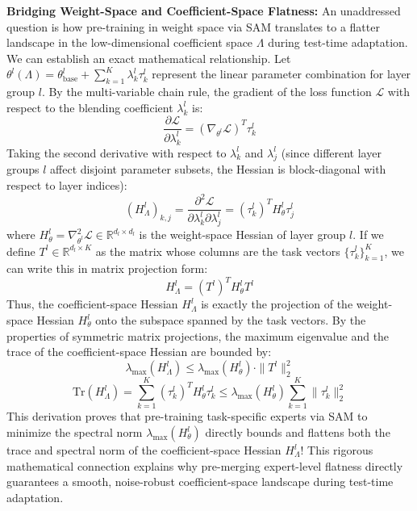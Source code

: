\textbf{Bridging Weight-Space and Coefficient-Space Flatness:}
An unaddressed question is how pre-training in weight space via SAM translates to a flatter landscape in the low-dimensional coefficient space $\Lambda$ during test-time adaptation. We can establish an exact mathematical relationship. Let $\theta^l(\Lambda) = \theta^l_{\text{base}} + \sum_{k=1}^K \lambda^l_k \tau^l_k$ represent the linear parameter combination for layer group $l$. By the multi-variable chain rule, the gradient of the loss function $\mathcal{L}$ with respect to the blending coefficient $\lambda^l_k$ is:
\begin{equation}
\frac{\partial \mathcal{L}}{\partial \lambda^l_k} = \left(\nabla_{\theta^l} \mathcal{L}\right)^T \tau^l_k
\end{equation}
Taking the second derivative with respect to $\lambda^l_k$ and $\lambda^l_j$ (since different layer groups $l$ affect disjoint parameter subsets, the Hessian is block-diagonal with respect to layer indices):
\begin{equation}
(H^l_{\Lambda})_{k, j} = \frac{\partial^2 \mathcal{L}}{\partial \lambda^l_k \partial \lambda^l_j} = (\tau^l_k)^T H^l_{\theta} \tau^l_j
\end{equation}
where $H^l_{\theta} = \nabla^2_{\theta^l} \mathcal{L} \in \mathbb{R}^{d_l \times d_l}$ is the weight-space Hessian of layer group $l$. If we define $T^l \in \mathbb{R}^{d_l \times K}$ as the matrix whose columns are the task vectors $\{\tau^l_k\}_{k=1}^K$, we can write this in matrix projection form:
\begin{equation}
H^l_{\Lambda} = (T^l)^T H^l_{\theta} T^l
\end{equation}
Thus, the coefficient-space Hessian $H^l_{\Lambda}$ is exactly the projection of the weight-space Hessian $H^l_{\theta}$ onto the subspace spanned by the task vectors. By the properties of symmetric matrix projections, the maximum eigenvalue and the trace of the coefficient-space Hessian are bounded by:
\begin{equation}
\lambda_{\max}(H^l_{\Lambda}) \le \lambda_{\max}(H^l_{\theta}) \cdot \|T^l\|_2^2
\end{equation}
\begin{equation}
\text{Tr}(H^l_{\Lambda}) = \sum_{k=1}^K (\tau^l_k)^T H^l_{\theta} \tau^l_k \le \lambda_{\max}(H^l_{\theta}) \sum_{k=1}^K \|\tau^l_k\|_2^2
\end{equation}
This derivation proves that pre-training task-specific experts via SAM to minimize the spectral norm $\lambda_{\max}(H^l_{\theta})$ directly bounds and flattens both the trace and spectral norm of the coefficient-space Hessian $H^l_{\Lambda}$! This rigorous mathematical connection explains why pre-merging expert-level flatness directly guarantees a smooth, noise-robust coefficient-space landscape during test-time adaptation.

